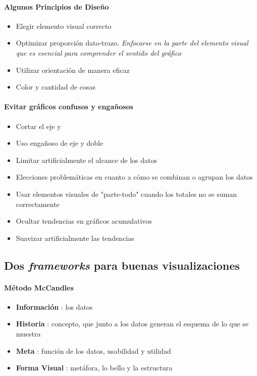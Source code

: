 \paragraph{Algunos Principios de Diseño}
\begin{itemize}
    \item {Elegir elemento visual correcto}
    \item {Optimizar proporción dato-trazo. \textit{Enfocarse en la parte del elemento visual que es esencial para comprender el sentido del gráfico}}
    \item {Utilizar orientación de manera eficaz}
    \item {Color y cantidad de cosas}
\end{itemize}

\paragraph{Evitar gráficos confusos y engañosos}
\begin{itemize}
    \item {Cortar el eje y}
    \item {Uso engañoso de eje y doble}
    \item {Limitar artificialmente el alcance de los datos}
    \item {Elecciones problemáticas en cuanto a cómo se combinan o agrupan los datos}
    \item {Usar elementos visuales de "parte-todo" cuando los totales no se suman correctamente}
    \item {Ocultar tendencias en gráficos acumulativos}
    \item {Suavizar artificialmente las tendencias}
\end{itemize}

\subsection{Dos \textit{frameworks} para buenas visualizaciones}
\paragraph{Método McCandles}
\begin{itemize}
    \item {\textbf{Información} : los datos}
    \item {\textbf{Historia} : concepto, que junto a los datos generan el esquema de lo que se muestra}
    \item {\textbf{Meta} : función de los datos, usabilidad y utilidad}
    \item {\textbf{Forma Visual} : metáfora, lo bello y la estructura}
\end{itemize}

